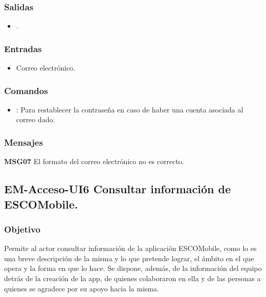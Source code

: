 \subsubsection{Salidas}
	\begin{itemize}
		\item {}.
	\end{itemize}

\subsubsection{Entradas}
	\begin{itemize}
		\item Correo electrónico.
	\end{itemize}

\subsubsection{Comandos}
	\begin{itemize}
		\item {}: Para restablecer la contraseña en caso de haber una cuenta asociada
		al correo dado.
	\end{itemize}

\subsubsection{Mensajes}
	
	\begin{Citemize}
		\item {\bf MSG07} El formato del correo electrónico no es correcto.
	\end{Citemize}




\subsection{EM-Acceso-UI6 Consultar información de ESCOMobile.}

\subsubsection{Objetivo}
	\noindent
	Permite al actor consultar información de la aplicación ESCOMobile, como lo es una breve
	descripción de la misma y lo que pretende lograr, el ámbito en el que opera y la forma en que lo hace. Se
	dispone, además, de la información del equipo detrás de la creación de la app, de quienes colaboraron en
	ella y de las personas a quienes se agradece por su apoyo hacia la misma.

